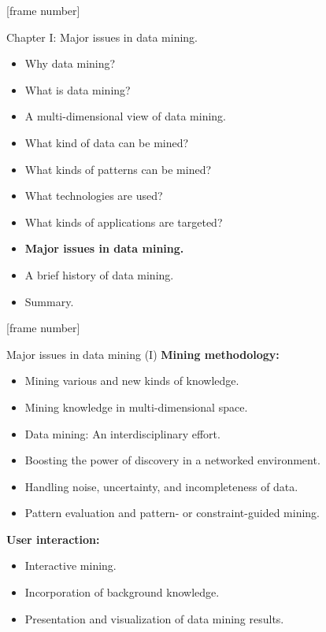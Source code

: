 \documentclass[aspectratio=169,t]{beamer}
\begin{document}
 {
    [frame number]
    \begin{frame}{Chapter I: Major issues in data mining.}
        \begin{itemize}
            \item Why data mining?
            \item What is data mining?
            \item A multi-dimensional view of data mining.
            \item What kind of data can be mined?
            \item What kinds of patterns can be mined?
            \item What technologies are used?
            \item What kinds of applications are targeted?
            \item \textbf{Major issues in data mining.}
            \item A brief history of data mining.
            \item Summary.
        \end{itemize}
    \end{frame}
  }

  {
    [frame number]
    \begin{frame}{Major issues in data mining (I)}
    \textbf{Mining methodology:}\\
    \begin{itemize}
        \item Mining various and new kinds of knowledge.
        \item Mining knowledge in multi-dimensional space.
        \item Data mining: An interdisciplinary effort.
        \item Boosting the power of discovery in a networked environment.
        \item Handling noise, uncertainty, and incompleteness of data.
        \item Pattern evaluation and pattern- or constraint-guided mining.
    \end{itemize}
    \textbf{User interaction:}\\
    \begin{itemize}
        \item Interactive mining.
        \item Incorporation of background knowledge.
        \item Presentation and visualization of data mining results.
    \end{itemize}
    \end{frame}
  }
\end{document}
